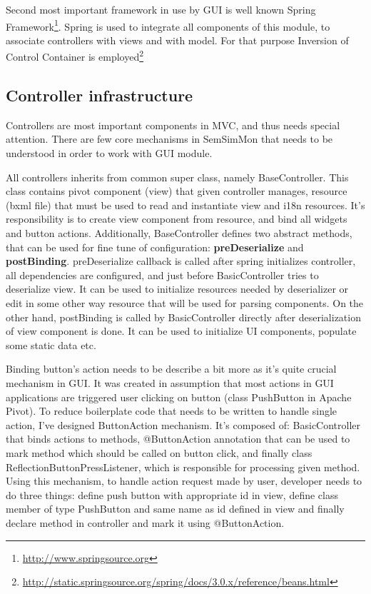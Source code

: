 Second most important framework in use by GUI is well known Spring Framework\footnote{\url{http://www.springsource.org}}. Spring is used to integrate all components of this module, to associate controllers with views and with model. For that purpose Inversion of Control Container is
employed\footnote{\url{http://static.springsource.org/spring/docs/3.0.x/reference/beans.html}}

\subsection{Controller infrastructure}

Controllers are most important components in MVC, and thus needs special attention. There are few core mechanisms in
SemSimMon that needs to be understood in order to work with GUI module. 

All controllers inherits from common super class, namely BaseController. This class contains pivot component (view)
that given controller manages, resource (bxml file) that must be used to read and instantiate view and i18n resources. 
It's responsibility is to create view component from resource, and bind all widgets and button actions. Additionally,
BaseController defines two abstract methods, that can be used for fine tune of configuration: \textbf{preDeserialize} and
\textbf{postBinding}. preDeserialize callback is called after spring initializes controller, all dependencies are
configured, and just before BasicController tries to deserialize view. It can be used to initialize resources
needed by deserializer or edit in some other way resource that will be used for parsing components. On the other hand,
postBinding is called by BasicController directly after deserialization of view component is done. It can be used to initialize UI components,
populate some static data etc.

Binding button's action needs to be describe a bit more as it's quite crucial mechanism in GUI. It was created in
assumption that most actions in GUI applications are triggered user clicking on button (class PushButton in Apache
Pivot). To reduce boilerplate code that needs to be written to handle single action, I've designed ButtonAction
mechanism. It's composed of: BasicController that binds actions to methods, @ButtonAction annotation that can be used
to mark method which should be called on button click, and finally class ReflectionButtonPressListener, which is
responsible for processing given method. Using this mechanism, to handle action request made by user, developer needs
to do three things: define push button with appropriate id in view, define class member of type PushButton and same
name as id defined in view and finally declare method in controller and mark it using @ButtonAction. 

